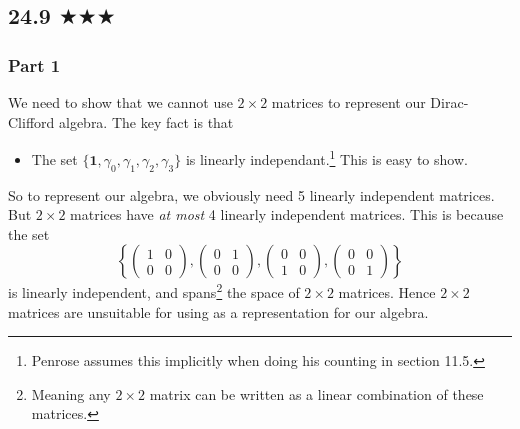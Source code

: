 

\subsection{24.9 $\bigstar \bigstar\bigstar$}
\subsubsection*{Part 1}
We need to show that we cannot use $2\times 2$ matrices to represent our Dirac-Clifford algebra. The key fact is that 
\begin{itemize}
\item The set $\{\mathbf{1},\gamma_0,\gamma_1,\gamma_2,\gamma_3\}$ is linearly independant.\footnote{Penrose assumes this implicitly when doing his counting in section 11.5.} This is easy to show.
\end{itemize}
So to represent our algebra, we obviously need 5 linearly independent matrices. But $2\times 2$ matrices have \emph{at most} 4 linearly independent matrices. This is because the set
$$\left\{
\begin{pmatrix} 
1&0 \\
0&0
\end{pmatrix},\begin{pmatrix} 
0&1 \\
0&0
\end{pmatrix},\begin{pmatrix} 
0&0 \\
1&0
\end{pmatrix},\begin{pmatrix} 
0&0 \\
0&1
\end{pmatrix}\right\}$$
is linearly independent, and spans\footnote{Meaning any $2\times 2$ matrix can be written as a linear combination of these matrices. } the space of $2\times 2$ matrices. Hence $2\times 2$ matrices are unsuitable for using as a representation for our algebra.

